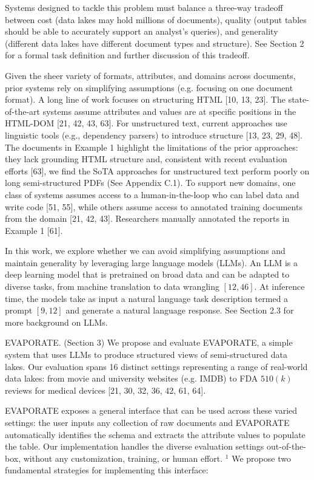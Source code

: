 \documentclass[10pt]{article}
\begin{document}
Systems designed to tackle this problem must balance a three-way tradeoff between cost (data lakes may hold millions of documents), quality (output tables should be able to accurately support an analyst's queries), and generality (different data lakes have different document types and structure). See Section 2 for a formal task definition and further discussion of this tradeoff.

Given the sheer variety of formats, attributes, and domains across documents, prior systems rely on simplifying assumptions (e.g. focusing on one document format). A long line of work focuses on structuring HTML [10, 13, 23]. The state-of-the-art systems assume attributes and values are at specific positions in the HTML-DOM [21, 42, 43, 63]. For unstructured text, current approaches use linguistic tools (e.g., dependency parsers) to introduce structure [13, 23, 29, 48]. The documents in Example 1 highlight the limitations of the prior approaches: they lack grounding HTML structure and, consistent with recent evaluation efforts [63], we find the SoTA approaches for unstructured text perform poorly on long semi-structured PDFs (See Appendix C.1). To support new domains, one class of systems assumes access to a human-in-the-loop who can label data and write code [51, 55], while others assume access to annotated training documents from the domain [21, 42, 43]. Researchers manually annotated the reports in Example 1 [61].

In this work, we explore whether we can avoid simplifying assumptions and maintain generality by leveraging large language models (LLMs). An LLM is a deep learning model that is pretrained on broad data and can be adapted to diverse tasks, from machine translation to data wrangling $[12,46]$. At inference time, the models take as input a natural language task description termed a prompt $[9,12]$ and generate a natural language response. See Section 2.3 for more background on LLMs.

EVAPORATE. (Section 3) We propose and evaluate EVAPORATE, a simple system that uses LLMs to produce structured views of semi-structured data lakes. Our evaluation spans 16 distinct settings representing a range of real-world data lakes: from movie and university websites (e.g. IMDB) to FDA $510(k)$ reviews for medical devices [21, 30, 32, 36, 42, 61, 64].

EVAPORATE exposes a general interface that can be used across these varied settings: the user inputs any collection of raw documents and EVAPORATE automatically identifies the schema and extracts the attribute values to populate the table. Our implementation handles the diverse evaluation settings out-of-the-box, without any customization, training, or human effort. ${ }^{1}$ We propose two fundamental strategies for implementing this interface:
\end{document}
